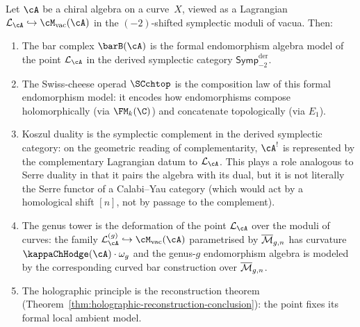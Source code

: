\begin{conjecture}
\label{conj:chiral-as-endomorphism}
Let $\cA$ be a chiral algebra on a curve~$X$, viewed as a
Lagrangian $\cL_\cA \hookrightarrow \Mvac(\cA)$ in the
$(-2)$-shifted symplectic moduli of vacua. Then:
\begin{enumerate}[label=\textup{(\roman*)}]
\item The bar complex $\barB(\cA)$ is the formal endomorphism
 algebra model of
 the point $\cL_\cA$ in the derived symplectic category
 $\mathsf{Symp}^{\mathrm{der}}_{-2}$.

\item The Swiss-cheese operad $\SCchtop$ is the composition law of
 this formal endomorphism model: it encodes how endomorphisms compose
 holomorphically (via $\FM_k(\C)$) and concatenate topologically
 (via $E_1$).

\item Koszul duality is the symplectic complement in the derived
 symplectic category: on the geometric reading of
 complementarity, $\cA^!$ is represented by the complementary
 Lagrangian datum to $\cL_\cA$. This plays a role analogous to Serre duality
 in that it pairs the algebra with its dual, but it is not literally
 the Serre functor of a Calabi--Yau category (which would act by
 a homological shift $[n]$, not by passage to the complement).

\item The genus tower is the deformation of the point $\cL_\cA$
 over the moduli of curves: the family
 $\cL_\cA^{(g)} \hookrightarrow \Mvac(\cA)$ parametrised
 by $\overline{\mathcal M}_{g,n}$ has curvature $\kappaChHodge(\cA) \cdot \omega_g$
 and the genus-$g$ endomorphism algebra is modeled by the
 corresponding curved bar construction over $\overline{\mathcal M}_{g,n}$.

\item The holographic principle is the reconstruction theorem
 \textup{(}Theorem~\textup{\ref{thm:holographic-reconstruction-conclusion}}\textup{)}:
 the point fixes its formal local ambient model.
\end{enumerate}
\end{conjecture}

